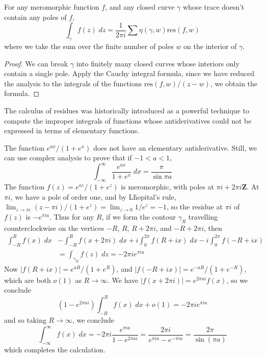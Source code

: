 \begin{theorem}
    For any meromorphic function $f$, and any closed curve $\gamma$ whose trace doesn't contain any poles of $f$,
    \[ \int_\gamma f(z)\; dz = \frac{1}{2 \pi i} \sum \eta(\gamma,w) \text{res}(f,w) \]
    where we take the sum over the finite number of poles $w$ on the interior of $\gamma$.
\end{theorem}
\begin{proof}
    We can break $\gamma$ into finitely many closed curves whose interiors only contain a single pole. Apply the Cauchy integral formula, since we have reduced the analysis to the integrals of the functions $\text{res}(f,w)/(z - w)$, we obtain the formula.
\end{proof}

The calculus of residues was historically introduced as a powerful technique to compute the improper integrals of functions whose antiderivatives could not be expressed in terms of elementary functions.

\begin{example}
    The function $e^{ax}/(1 + e^x)$ does not have an elementary antiderivative. Still, we can use complex analysis to prove that if $-1 < a < 1$,
    \[ \int_{-\infty}^\infty \frac{e^{ax}}{1 + e^x}\; dx = \frac{\pi}{\sin \pi a} \]
    The function $f(z) = e^{az}/(1 + e^z)$ is meromorphic, with poles at $\pi i + 2 \pi i \mathbf{Z}$. At $\pi i$, we have a pole of order one, and by L\'{h}opital's rule, $\lim_{z \to \pi i} (z - \pi i)/(1 + e^z) = \lim_{z \to 0} 1/e^z = -1$, so the residue at $\pi i$ of $f(z)$ is $-e^{\pi i a}$. Thus for any $R$, if we form the contour $\gamma_R$ travelling counterclockwise on the vertices $-R$, $R$, $R + 2 \pi i$, and $-R + 2 \pi i$, then
    \begin{align*}
        \int_{-R}^R f(x)\; dx &- \int_{-R}^R f(x + 2 \pi i)\; dx + i \int_0^{2\pi} f(R + ix)\; dx - i \int_0^{2\pi} f(-R + ix)\\
        &= \int_{\gamma_R} f(z)\; dz = - 2 \pi i e^{\pi i a}
    \end{align*}
    Now $|f(R + ix)| = e^{aR}/(1 + e^R)$, and $|f(-R+ix)| = e^{-aR}/(1 + e^{-R})$, which are both $o(1)$ as $R \to \infty$. We have $|f(x + 2 \pi i)| = e^{2 \pi a i} f(x)$, so we conclude
    \[ (1 - e^{2 \pi a i}) \int_{-R}^R f(x)\; dx + o(1) = - 2\pi i e^{\pi i a} \]
    and so taking $R \to \infty$, we conclude
    \[ \int_{-\infty}^\infty f(x)\; dx = -2 \pi i \frac{e^{\pi i a}}{1 - e^{2 \pi a i}} = \frac{2 \pi i}{e^{\pi i a} - e^{- \pi i a}} = \frac{2 \pi}{\sin(\pi a)} \]
    which completes the calculation.
\end{example}

